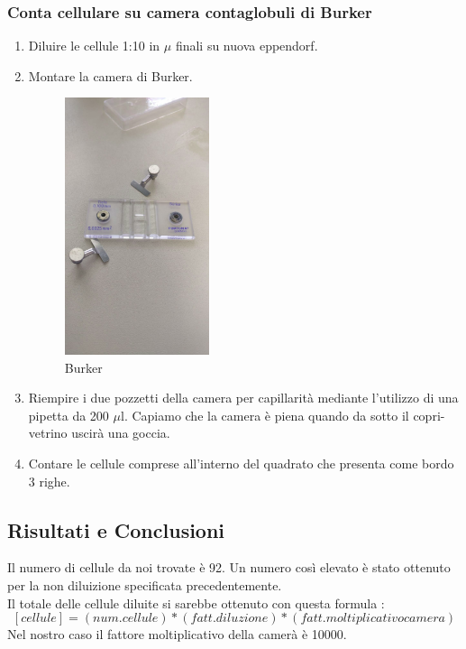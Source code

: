 \subsubsection{Conta cellulare su camera contaglobuli di Burker}
\begin{enumerate}
    \item Diluire le cellule 1:10 in $\mu$ finali su nuova eppendorf.
    \item Montare la camera di Burker.

    \begin{figure}[H]
    \centering
    \includegraphics[width = 0.4\textwidth]{./immagini/Burker.png}
    \caption{Burker}
    \end{figure}

    \item Riempire i due pozzetti della camera per capillarità mediante l'utilizzo di
    una pipetta da 200 $\mu$l. Capiamo che la camera è piena quando da sotto il
    copri-vetrino uscirà una goccia.
    \item Contare le cellule comprese all'interno del quadrato che presenta come bordo 3
    righe.
\end{enumerate}

\subsection{Risultati e Conclusioni}

Il numero di cellule da noi trovate è 92. Un numero così elevato è stato ottenuto per la
non diluizione specificata precedentemente. \\
Il totale delle cellule diluite si sarebbe ottenuto con questa formula :
    $$[cellule] = (num. cellule)*(fatt. diluzione)*(fatt. moltiplicativo camera)$$
Nel nostro caso il fattore moltiplicativo della camerà è 10000.


